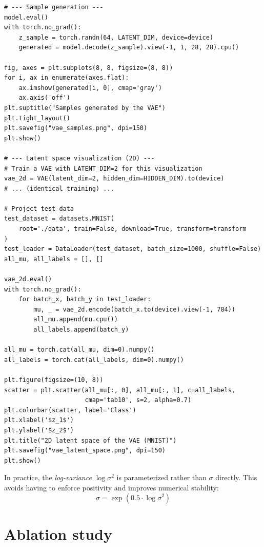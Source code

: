 \begin{codeblock}[title=\textbf{Sample generation and latent space visualization}]
\begin{verbatim}
# --- Sample generation ---
model.eval()
with torch.no_grad():
    z_sample = torch.randn(64, LATENT_DIM, device=device)
    generated = model.decode(z_sample).view(-1, 1, 28, 28).cpu()

fig, axes = plt.subplots(8, 8, figsize=(8, 8))
for i, ax in enumerate(axes.flat):
    ax.imshow(generated[i, 0], cmap='gray')
    ax.axis('off')
plt.suptitle("Samples generated by the VAE")
plt.tight_layout()
plt.savefig("vae_samples.png", dpi=150)
plt.show()

# --- Latent space visualization (2D) ---
# Train a VAE with LATENT_DIM=2 for this visualization
vae_2d = VAE(latent_dim=2, hidden_dim=HIDDEN_DIM).to(device)
# ... (identical training) ...

# Project test data
test_dataset = datasets.MNIST(
    root='./data', train=False, download=True, transform=transform
)
test_loader = DataLoader(test_dataset, batch_size=1000, shuffle=False)
all_mu, all_labels = [], []

vae_2d.eval()
with torch.no_grad():
    for batch_x, batch_y in test_loader:
        mu, _ = vae_2d.encode(batch_x.to(device).view(-1, 784))
        all_mu.append(mu.cpu())
        all_labels.append(batch_y)

all_mu = torch.cat(all_mu, dim=0).numpy()
all_labels = torch.cat(all_labels, dim=0).numpy()

plt.figure(figsize=(10, 8))
scatter = plt.scatter(all_mu[:, 0], all_mu[:, 1], c=all_labels,
                      cmap='tab10', s=2, alpha=0.7)
plt.colorbar(scatter, label='Class')
plt.xlabel('$z_1$')
plt.ylabel('$z_2$')
plt.title("2D latent space of the VAE (MNIST)")
plt.savefig("vae_latent_space.png", dpi=150)
plt.show()
\end{verbatim}
\end{codeblock}

\begin{bestpractice}
In practice, the \emph{log-variance} $\log \sigma^2$ is parameterized rather than $\sigma$ directly. This avoids having to enforce positivity and improves numerical stability:
\begin{equation}
\sigma = \exp(0.5 \cdot \log \sigma^2)
\end{equation}
\end{bestpractice}

\section{Ablation study}
\label{sec:vae-ablation}

